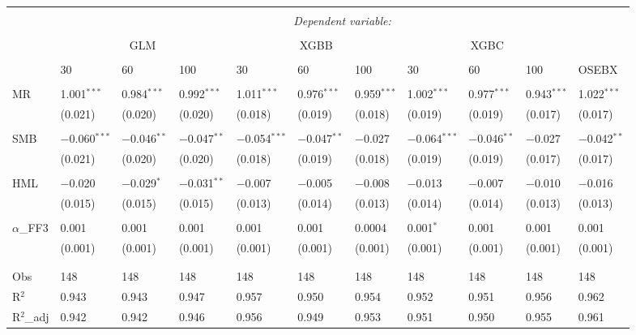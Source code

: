 \begin{table}[H] \centering 
\footnotesize
\begin{tabularx}{\textwidth}{XXXX|XXX|XXX|l} 
\\[-2ex]\hline 
\hline \\[-2ex] 
 & \multicolumn{10}{c}{\textit{Dependent variable:}} \\ 
\cline{2-11} 
\\[-2ex] 
 & \multicolumn{3}{c}{GLM} & \multicolumn{3}{c}{XGBB} & \multicolumn{3}{c}{XGBC} & \\
 \cline{2-10}
 \\[-2ex] 
 & 30 & 60 & 100 & 30 & 60 & 100 & 30 & 60 & 100 & OSEBX \\ 
 \cline{2-10} \\
 MR & 1.001$^{***}$ & 0.984$^{***}$ & 0.992$^{***}$ & 1.011$^{***}$ & 0.976$^{***}$ & 0.959$^{***}$ & 1.002$^{***}$ & 0.977$^{***}$ & 0.943$^{***}$ & 1.022$^{***}$ \\ 
  & (0.021) & (0.020) & (0.020) & (0.018) & (0.019) & (0.018) & (0.019) & (0.019) & (0.017) & (0.017) \\ 
   & & & & & & & & & & \\ 
 SMB & $-$0.060$^{***}$ & $-$0.046$^{**}$ & $-$0.047$^{**}$ & $-$0.054$^{***}$ & $-$0.047$^{**}$ & $-$0.027 & $-$0.064$^{***}$ & $-$0.046$^{**}$ & $-$0.027 & $-$0.042$^{**}$ \\ 
  & (0.021) & (0.020) & (0.020) & (0.018) & (0.019) & (0.018) & (0.019) & (0.019) & (0.017) & (0.017) \\ 
   & & & & & & & & & & \\ 
 HML & $-$0.020 & $-$0.029$^{*}$ & $-$0.031$^{**}$ & $-$0.007 & $-$0.005 & $-$0.008 & $-$0.013 & $-$0.007 & $-$0.010 & $-$0.016 \\ 
  & (0.015) & (0.015) & (0.015) & (0.013) & (0.014) & (0.013) & (0.014) & (0.014) & (0.013) & (0.013) \\ 
   & & & & & & & & & & \\ 
 $\alpha$_{FF3} & 0.001 & 0.001 & 0.001 & 0.001 & 0.001 & 0.0004 & 0.001$^{*}$ & 0.001 & 0.001 & 0.001 \\ 
  & (0.001) & (0.001) & (0.001) & (0.001) & (0.001) & (0.001) & (0.001) & (0.001) & (0.001) & (0.001) \\ 
   & & & & & & & & & & \\ 
\hline \\[-2ex] 
Obs & 148 & 148 & 148 & 148 & 148 & 148 & 148 & 148 & 148 & 148 \\ 
R$^{2}$ & 0.943 & 0.943 & 0.947 & 0.957 & 0.950 & 0.954 & 0.952 & 0.951 & 0.956 & 0.962 \\ 
R$^{2}$_{adj} & 0.942 & 0.942 & 0.946 & 0.956 & 0.949 & 0.953 & 0.951 & 0.950 & 0.955 & 0.961 \\ 


\end{tabularx}
\end{table}
